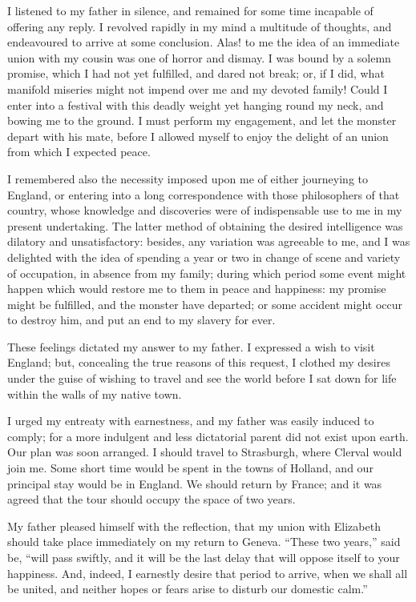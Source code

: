 I listened to my father in silence,
and remained for some time incapable
of offering any reply. I revolved rapidly
in my mind a multitude of thoughts,
and endeavoured to arrive at some conclusion.
Alas! to me the idea of an
immediate union with my cousin was
one of horror and dismay. I was bound
by a solemn promise, which I had not
yet fulfilled, and dared not break; or,
if I did, what manifold miseries might
not impend over me and my devoted
family! Could I enter into a festival
with this deadly weight yet hanging
round my neck, and bowing me to the
ground. I must perform my engagement,
and let the monster depart with
his mate, before I allowed myself to
enjoy the delight of an union from
which I expected peace.

I remembered also the necessity imposed
upon me of either journeying to
England, or entering into a long correspondence
with those philosophers of
that country, whose knowledge and discoveries
were of indispensable use to
me in my present undertaking. The
latter method of obtaining the desired
intelligence was dilatory and unsatisfactory:
besides, any variation was
agreeable to me, and I was delighted
with the idea of spending a year or two
in change of scene and variety of occupation,
in absence from my family;
during which period some event might
happen which would restore me to them
in peace and happiness: my promise
might be fulfilled, and the monster
have departed; or some accident might
occur to destroy him, and put an end
to my slavery for ever.

These feelings dictated my answer to
my father. I expressed a wish to visit
England; but, concealing the true reasons
of this request, I clothed my desires
under the guise of wishing to
travel and see the world before I sat
down for life within the walls of my
native town.

I urged my entreaty with earnestness,
and my father was easily induced
to comply; for a more indulgent and
less dictatorial parent did not exist
upon earth. Our plan was soon arranged.
I should travel to Strasburgh,
where Clerval would join me. Some
short time would be spent in the towns
of Holland, and our principal stay
would be in England. We should return
by France; and it was agreed
that the tour should occupy the space
of two years.

My father pleased himself with the
reflection, that my union with Elizabeth
should take place immediately on my
return to Geneva. ``These two years,''
said be, ``will pass swiftly, and it will
be the last delay that will oppose itself
to your happiness. And, indeed, I
earnestly desire that period to arrive,
when we shall all be united, and neither
hopes or fears arise to disturb our
domestic calm.''

